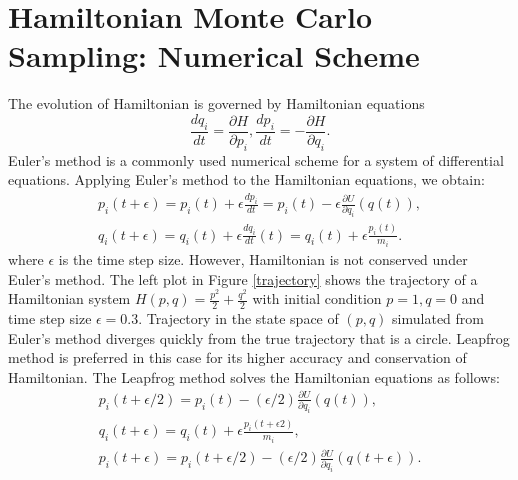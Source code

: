 \documentclass[twoside]{article}
\begin{document}
\section{Hamiltonian Monte Carlo Sampling: Numerical Scheme}
The evolution of Hamiltonian is governed by Hamiltonian equations
\begin{equation}
\frac{dq_i}{dt}=\frac{\partial H}{\partial p_i}, \frac{dp_i}{dt}=-\frac{\partial H}{\partial q_i}.
\end{equation}
Euler's method is a commonly used numerical scheme for a system of differential equations. Applying Euler's method to the Hamiltonian equations, we obtain:
\begin{eqnarray}
p_i(t+\epsilon)=p_i(t)+\epsilon\frac{dp_i}{dt}=p_i(t)-\epsilon\frac{\partial U}{\partial q_i}(q(t)),\\
q_i(t+\epsilon)=q_i(t)+\epsilon\frac{dq_i}{dt}(t)=q_i(t)+\epsilon\frac{p_i(t)}{m_i}.
\end{eqnarray}
where $\epsilon$ is the time step size. However, Hamiltonian is not conserved under Euler's method. The left plot in Figure \ref{trajectory} shows the trajectory of a Hamiltonian system $H(p,q)=\frac{p^2}{2}+\frac{q^2}{2}$ with initial condition $p=1, q=0$ and time step size $\epsilon=0.3$. Trajectory in the state space of $(p,q)$ simulated from Euler's method diverges quickly from the true trajectory that is a circle. Leapfrog method is preferred in this case for its higher accuracy and conservation of Hamiltonian. The Leapfrog method solves the Hamiltonian equations as follows:
\begin{eqnarray}
p_i(t+\epsilon/2)=p_i(t)-(\epsilon/2)\frac{\partial U}{\partial q_i}(q(t)),\\
q_i(t+\epsilon)=q_i(t)+\epsilon\frac{p_i(t+\epsilon2)}{m_i},\\
p_i(t+\epsilon)=p_i(t+\epsilon/2)-(\epsilon/2)\frac{\partial U}{\partial q_i}(q(t+\epsilon)).
\end{eqnarray}
\end{document}
